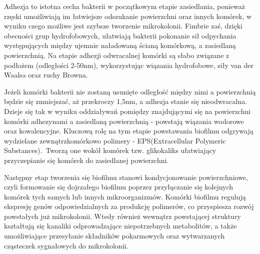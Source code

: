 \documentclass[11pt,a4paper]{report}
\begin{document}
Adhezja to istotna cecha bakterii w początkowym etapie zasiedlania, ponieważ rzęski umożliwiają im łatwiejsze odszukanie powierzchni oraz innych komórek, w wyniku czego możliwe jest szybsze tworzenie mikrokolonii. Fimbrie zaś, dzięki obecności grup hydrofobowych, ułatwiają bakterii pokonanie sił odpychania występujących między ujemnie naładowaną ścianą komórkową, a zasiedlaną powierzchnią.
Na etapie adhezji odwracalnej komórki są słabo związane z podłożem (odległości 2-50nm), wykorzystując wiązania hydrofobowe, siły van der Waalsa oraz ruchy Browna\cite{czaczyk, kolwzan}.\

Jeżeli komórki bakterii nie zostaną usunięte odległość między nimi a powierzchnią będzie się zmniejszać, aż przekroczy 1,5nm, a adhezja stanie się nieodwracalna\cite{czaczyk, kolwzan}.
Dzieje się tak w wyniku oddziaływań pomiędzy znajdującymi się na powierzchni komórki adhezynami a zasiedlaną powierzchnią - powstają wiązania wodorowe oraz kowalencyjne\cite{myszka}.
Kluczową rolę na tym etapie powstawania biofilmu odgrywają wydzielane zewnątrzkomórkowo polimery - EPS(Extracellular Polymeric Substances).\ 
Tworzą one wokół komórek tzw. glikokaliks ułatwiający przyczepianie się komórek do zasiedlanej powierzchni\cite{shi}.\


Następny etap tworzenia się biofilmu stanowi kondycjonowanie powierzchniowe, czyli formowanie się dojrzałego biofilmu poprzez przyłączanie się kolejnych komórek tych samych lub innych mikroorganizmów. Komórki biofilmu regulują ekspresję genów odpowiedzialnych za produkcję polimerów, co przyspiesza rozwój powstałych już mikrokolonii. Wtedy również wewnątrz powstającej struktury kształtują się kanaliki odprowadzające niepotrzebnych metabolitów, a także umożliwiające przesyłanie składników pokarmowych oraz wytwarzanych cząsteczek sygnałowych do mikrokolonii\cite{Lawless, Stankowska, czaczyk-myszka}.\


\end{document}
